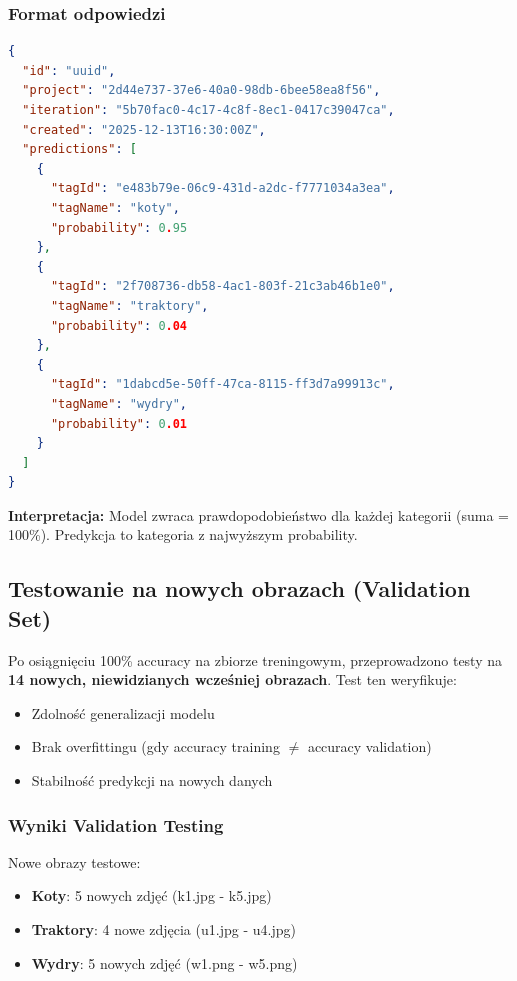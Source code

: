 \subsubsection{Format odpowiedzi}

\begin{lstlisting}[language=json, caption=Przykładowa odpowiedź Prediction API]
{
  "id": "uuid",
  "project": "2d44e737-37e6-40a0-98db-6bee58ea8f56",
  "iteration": "5b70fac0-4c17-4c8f-8ec1-0417c39047ca",
  "created": "2025-12-13T16:30:00Z",
  "predictions": [
    {
      "tagId": "e483b79e-06c9-431d-a2dc-f7771034a3ea",
      "tagName": "koty",
      "probability": 0.95
    },
    {
      "tagId": "2f708736-db58-4ac1-803f-21c3ab46b1e0",
      "tagName": "traktory",
      "probability": 0.04
    },
    {
      "tagId": "1dabcd5e-50ff-47ca-8115-ff3d7a99913c",
      "tagName": "wydry",
      "probability": 0.01
    }
  ]
}
\end{lstlisting}

\textbf{Interpretacja:} Model zwraca prawdopodobieństwo dla każdej kategorii (suma = 100\%). Predykcja to kategoria z najwyższym probability.

\subsection{Testowanie na nowych obrazach (Validation Set)}

Po osiągnięciu 100\% accuracy na zbiorze treningowym, przeprowadzono testy na \textbf{14 nowych, niewidzianych wcześniej obrazach}. Test ten weryfikuje:

\begin{itemize}
	\item Zdolność generalizacji modelu
	\item Brak overfittingu (gdy accuracy training $\neq$ accuracy validation)
	\item Stabilność predykcji na nowych danych
\end{itemize}

\subsubsection{Wyniki Validation Testing}

Nowe obrazy testowe:
\begin{itemize}
	\item \textbf{Koty}: 5 nowych zdjęć (k1.jpg - k5.jpg)
	\item \textbf{Traktory}: 4 nowe zdjęcia (u1.jpg - u4.jpg)
	\item \textbf{Wydry}: 5 nowych zdjęć (w1.png - w5.png)
\end{itemize}

